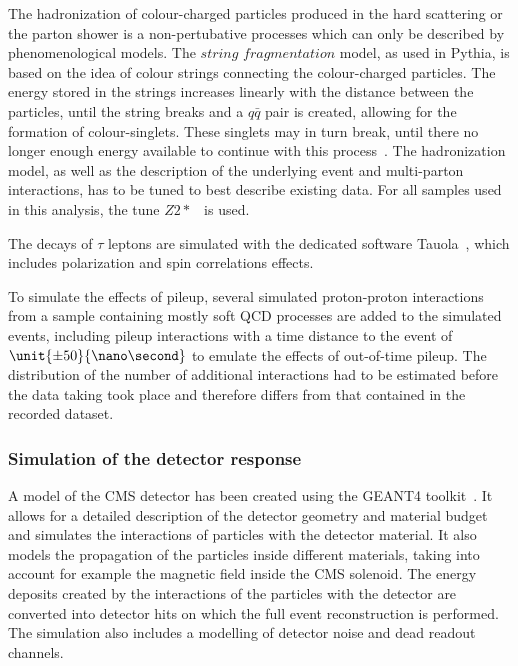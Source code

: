 The hadronization of colour-charged particles produced in the hard scattering or the parton shower is a non-pertubative processes which can only be described by phenomenological models. The $\textit{string fragmentation}$ model, as used in Pythia, is based on the idea of colour strings connecting the colour-charged particles. The energy stored in the strings increases linearly with the distance between the  particles, until the string breaks and a $q\bar{q}$ pair is created, allowing for the formation of colour-singlets. These singlets may in turn break, until there no longer enough energy available to continue with this process~\cite{Pythia}. The hadronization model, as well as the description of the underlying event and multi-parton interactions, has to be tuned to best describe existing data. For all samples used in this analysis, the tune $Z2{*}$~\cite{Field:2011iq} is used. 

The decays of $\tau$ leptons are simulated with the dedicated software Tauola~\cite{Jadach1993361}, which includes polarization and spin correlations effects. 

To simulate the effects of pileup, several simulated proton-proton interactions from a sample containing mostly soft QCD processes are added to the simulated events, including pileup interactions with a time distance to the event of $\unit{\pm50}{\nano\second}$ to emulate the effects of out-of-time pileup. The distribution of the number of additional interactions had to be estimated before the data taking took place and therefore differs from that contained in the recorded dataset. 

\subsubsection{Simulation of the detector response}
A model of the CMS detector has been created using the GEANT4 toolkit~\cite{Agostinelli:2002hh}. It allows for a detailed description of the detector geometry and material budget and simulates the interactions of particles with the detector material. It also models the propagation of the particles inside different materials, taking into account for example the magnetic field inside the CMS solenoid. The energy deposits created by the interactions of the particles with the detector are converted into detector hits on which the full event reconstruction is performed. The simulation also includes a modelling of detector noise and dead readout channels.  

